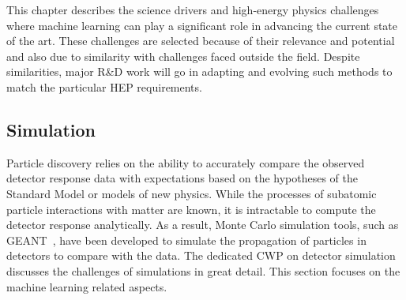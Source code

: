 

This chapter describes the science drivers and high-energy physics challenges where machine learning can play a significant role in advancing the current state of the art.
These challenges are selected because of their relevance and potential and also due to similarity with challenges faced outside the field.
Despite similarities, major R\&D work will go in adapting and evolving such methods to match the particular HEP requirements.


\subsection{Simulation}
\label{sec:fast-simulation}

Particle discovery relies on the ability to accurately compare the observed detector response data with expectations based on the hypotheses of the Standard Model or models of new physics.
While the processes of subatomic particle interactions with matter are known, it is intractable to compute the detector response analytically.
As a result, Monte Carlo simulation tools, such as GEANT~\cite{GEANT4}, have been developed to simulate the propagation of particles in detectors to compare with the data.
The dedicated CWP on detector simulation~\cite{simulationCWP} discusses the challenges of simulations in great detail.
This section focuses on the machine learning related aspects.




